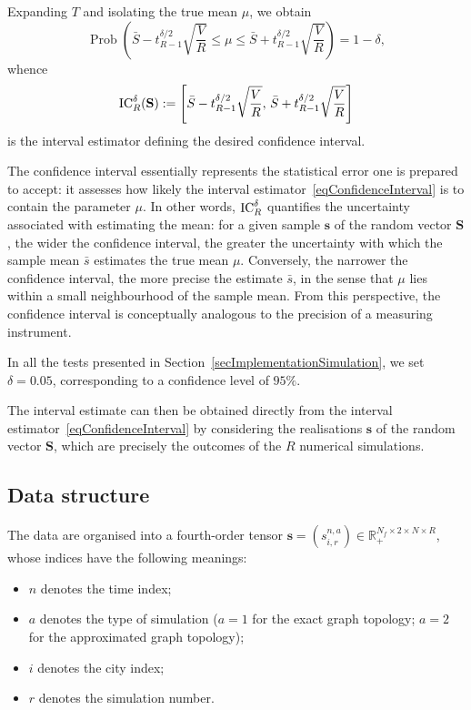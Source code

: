 \documentclass[a4paper]{article}
\newcommand{\R}{\mathbb{R}}
\begin{document}
Expanding $T$ and isolating the true mean $\mu$, we obtain
$$ \operatorname{Prob}\!\left(\bar{S}-t_{R-1}^{\delta/2}\sqrt{\frac{V}{R}}\leq\mu\leq\bar{S}+t_{R-1}^{\delta/2}\sqrt{\frac{V}{R}}\right)=1-\delta, $$
whence
\begin{equation}
    \IC^\delta_R(\mathbf S):=\left[\bar{S}-t_{R-1}^{\delta/2}\sqrt{\frac{V}{R}},\,\bar{S}+t_{R-1}^{\delta/2}\sqrt{\frac{V}{R}}\right]
    \label{eqConfidenceInterval}
\end{equation}
is the interval estimator defining the desired confidence interval.

The confidence interval essentially represents the statistical error one is prepared to accept: it assesses how likely the interval estimator~\eqref{eqConfidenceInterval} is to contain the parameter $\mu$. In other words, $\operatorname{IC}^\delta_R$ quantifies the uncertainty associated with estimating the mean: for a given sample $\mathbf s$ of the random vector $\mathbf S$, the wider the confidence interval, the greater the uncertainty with which the sample mean $\bar s$ estimates the true mean $\mu$. Conversely, the narrower the confidence interval, the more precise the estimate $\bar s$, in the sense that $\mu$ lies within a small neighbourhood of the sample mean. From this perspective, the confidence interval is conceptually analogous to the precision of a measuring instrument.

In all the tests presented in Section~\ref{secImplementationSimulation}, we set $\delta=0.05$, corresponding to a confidence level of $95\%$.

The interval estimate can then be obtained directly from the interval estimator~\eqref{eqConfidenceInterval} by considering the realisations $\mathbf s$ of the random vector $\mathbf S$, which are precisely the outcomes of the $R$ numerical simulations.
        
\subsection{Data structure}
The data are organised into a fourth-order tensor $\mathbf s=(s^{n,a}_{i,r})\in\R_+^{N_f\times 2\times N\times R}$, whose indices have the following meanings:
\begin{itemize}
\item $n$ denotes the time index;
\item $a$ denotes the type of simulation ($a=1$ for the exact graph topology; $a=2$ for the approximated graph topology);
\item $i$ denotes the city index;
\item $r$ denotes the simulation number.
\end{itemize}
\end{document}
